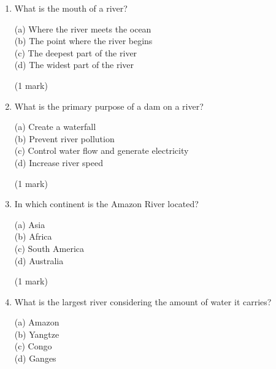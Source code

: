 \documentclass{article}
\begin{document}
\begin{enumerate}
    (a) Where the river meets the ocean \\
    (b) The point where the river begins \\
    (c) The deepest part of the river \\
    (d) The widest part of the river 

\hfill\raggedright (1 mark) 
\vspace{5pt}
\hline
\vspace{7pt}

    \newpage

    \item What is the mouth of a river?
    
    (a) Where the river meets the ocean \\
    (b) The point where the river begins \\
    (c) The deepest part of the river \\
    (d) The widest part of the river 

\hfill\raggedright (1 mark) 
\vspace{5pt}
\hline
\vspace{7pt} 

    \item What is the primary purpose of a dam on a river?

    (a) Create a waterfall \\
    (b) Prevent river pollution \\
    (c) Control water flow and generate electricity \\
    (d) Increase river speed 

\hfill\raggedright (1 mark) 
\vspace{5pt}
\hline
\vspace{7pt}
   
    \item In which continent is the Amazon River located?
    
    (a) Asia \\
    (b) Africa \\
    (c) South America \\
    (d) Australia 

\hfill\raggedright (1 mark) 
\vspace{5pt}
\hline
\vspace{7pt}

    \item What is the largest river considering the amount of water it carries?
    
    (a) Amazon \\
    (b) Yangtze \\
    (c) Congo \\
    (d) Ganges 


\end{enumerate}
\end{document}
